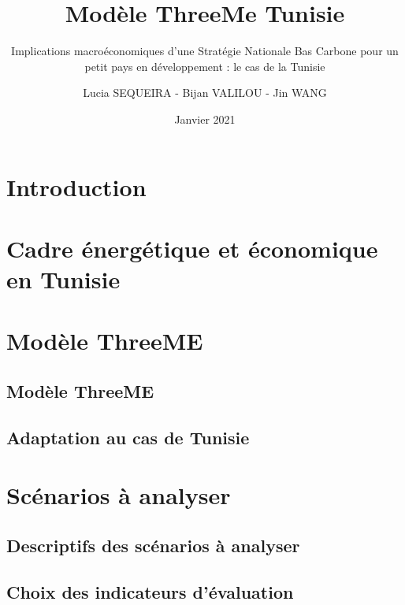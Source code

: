\documentclass[
]{article}
\title{Modèle ThreeMe Tunisie}
\subtitle{Implications macroéconomiques d'une Stratégie Nationale Bas
Carbone pour un petit pays en développement : le cas de la Tunisie}
\author{Lucia SEQUEIRA - Bijan VALILOU - Jin WANG}
\date{Janvier 2021}
\begin{document}
\maketitle

{
\setcounter{tocdepth}{2}
\tableofcontents
}
\newpage

\hypertarget{introduction}{%
\section{Introduction}\label{introduction}}

\hypertarget{cadre-uxe9nerguxe9tique-et-uxe9conomique-en-tunisie}{%
\section{Cadre énergétique et économique en
Tunisie}\label{cadre-uxe9nerguxe9tique-et-uxe9conomique-en-tunisie}}

\hypertarget{moduxe8le-threeme}{%
\section{Modèle ThreeME}\label{moduxe8le-threeme}}

\hypertarget{moduxe8le-threeme-1}{%
\subsection{Modèle ThreeME}\label{moduxe8le-threeme-1}}

\hypertarget{adaptation-au-cas-de-tunisie}{%
\subsection{Adaptation au cas de
Tunisie}\label{adaptation-au-cas-de-tunisie}}

\hypertarget{scuxe9narios-uxe0-analyser}{%
\section{Scénarios à analyser}\label{scuxe9narios-uxe0-analyser}}

\hypertarget{descriptifs-des-scuxe9narios-uxe0-analyser}{%
\subsection{Descriptifs des scénarios à
analyser}\label{descriptifs-des-scuxe9narios-uxe0-analyser}}

\hypertarget{choix-des-indicateurs-duxe9valuation}{%
\subsection{Choix des indicateurs
d'évaluation}\label{choix-des-indicateurs-duxe9valuation}}
\end{document}
